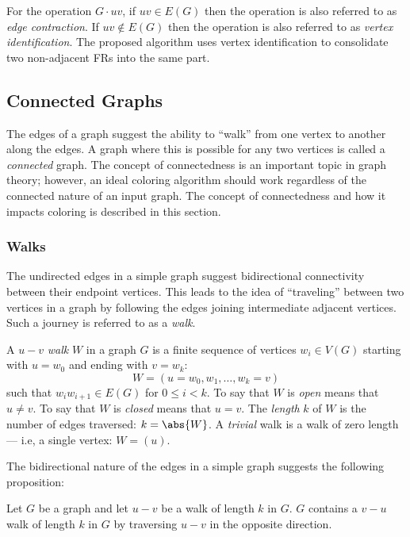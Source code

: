For the operation \(G\cdot uv\), if \(uv\in E(G)\) then the operation is also referred to as \emph{edge
  contraction}.  If \(uv\notin E(G)\) then the operation is also referred to as \emph{vertex identification}.  The
proposed algorithm uses vertex identification to consolidate two non-adjacent FRs into the same part.

\subsection{Connected Graphs}\label{sec:sub:connected}

The edges of a graph suggest the ability to ``walk'' from one vertex to another along the edges.  A graph where this
is possible for any two vertices is called a \emph{connected} graph.  The concept of connectedness is an
important topic in graph theory; however, an ideal coloring algorithm should work regardless of the connected
nature of an input graph.  The concept of connectedness and how it impacts coloring is described in this section.

\subsubsection{Walks}\label{sec:sub:sub:walks}

The undirected edges in a simple graph suggest bidirectional connectivity between their endpoint vertices.  This
leads to the idea of ``traveling'' between two vertices in a graph by following the edges joining intermediate
adjacent vertices.  Such a journey is referred to as a \emph{walk}.

A \(u-v\) \emph{walk} \(W\) in a graph \(G\) is a finite sequence of vertices \(w_i\in V(G)\) starting with
\(u=w_0\) and ending with \(v=w_k\):
\[W=(u=w_0,w_1,\ldots,w_k=v)\]
such that \(w_iw_{i+1}\in E(G)\) for \(0\le i<k\).  To say that \(W\) is \emph{open} means that \(u\ne v\).  To say
that \(W\) is \emph{closed} means that \(u=v\).  The \emph{length} \(k\) of \(W\) is the number of edges traversed:
\(k=\abs{W}\).  A \emph{trivial} walk is a walk of zero length --- i.e, a single vertex: \(W=(u)\).

The bidirectional nature of the edges in a simple graph suggests the following proposition:

\begin{proposition}
  Let \(G\) be a graph and let \(u-v\) be a walk of length \(k\) in \(G\).  \(G\) contains a \(v-u\) walk of length
  \(k\) in \(G\) by traversing \(u-v\) in the opposite direction.
\end{proposition}

